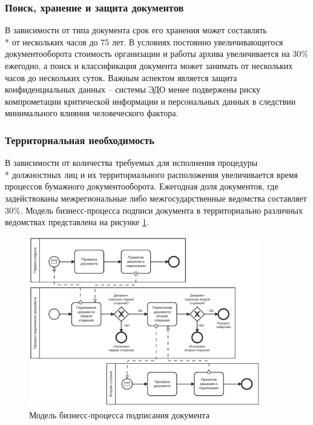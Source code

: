 \subsubsection{Поиск, хранение и защита документов}
В зависимости от типа документа срок его хранения может составлять \\* от нескольких часов до 75 лет\cite{fz-archive}. В условиях постоянно увеличивающегося документооборота стоимость организации и работы архива увеличивается на 30\% ежегодно\cite{archive-price}, а поиск и классификация документа может занимать от нескольких часов до нескольких суток. Важным аспектом является защита конфиденциальных данных -- системы ЭДО менее подвержены риску компрометации критической информации и персональных данных в следствии минимального влияния человеческого фактора.

\subsubsection{Территориальная необходимость}
В зависимости от количества требуемых для исполнения процедуры \\* должностных лиц и их территориального расположения увеличивается время процессов бумажного документооборота\cite{kontur}. Ежегодная доля документов, где задействованы межрегиональные либо межгосударственные ведомства составляет 30\%. Модель бизнесс-процесса подписи документа в территориально различных ведомствах представлена на рисунке \ref{fig:sign-flow}.

\begin{figure}[h!btp]
	\centering
	\includegraphics[width=0.9\textwidth]{inc/sign_flow_bpmn.pdf}
	\caption{Модель бизнесс-процесса подписания документа}
	\label{fig:sign-flow}	
\end{figure}

